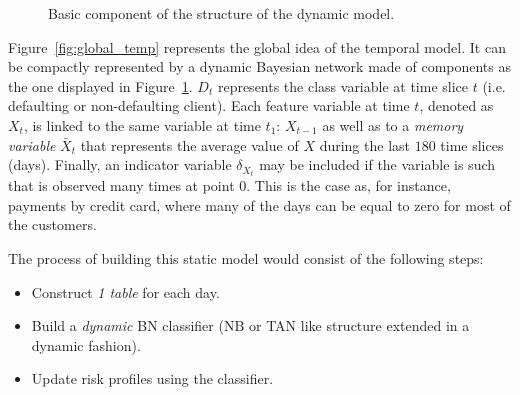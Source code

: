 \begin{figure}[ht]
\begin{center}
\end{center}
\caption{Basic component of the structure of the dynamic model.}
\label{fig:component}
\end{figure}

Figure~\ref{fig:global_temp} represents the global idea of the temporal model. It can be compactly
represented by a dynamic Bayesian network made of components as the one displayed in 
Figure~\ref{fig:component}. $D_t$ represents the class variable at time slice $t$ (i.e. defaulting or non-defaulting client). Each feature
variable at time $t$, denoted as $X_t$, is linked to the same variable at time $t_1$: $X_{t-1}$
as well as to a \emph{memory variable} $\bar{X}_t$ that represents the average value of $X$
during the last $180$ time slices (days). Finally, an indicator variable $\delta_{X_t}$ may
be included if the variable is such that is observed many times at point 0. This is the case as,
for instance, payments by credit card, where many of the days can be equal to zero for most of
the customers.


The process of building this static model would consist of the following steps:

\begin{itemize}
\item Construct \emph{1 table} for each day.
\item Build a \emph{dynamic} BN classifier (NB or TAN like structure extended in a dynamic fashion). 
\item Update risk profiles using the classifier.
\end{itemize}





